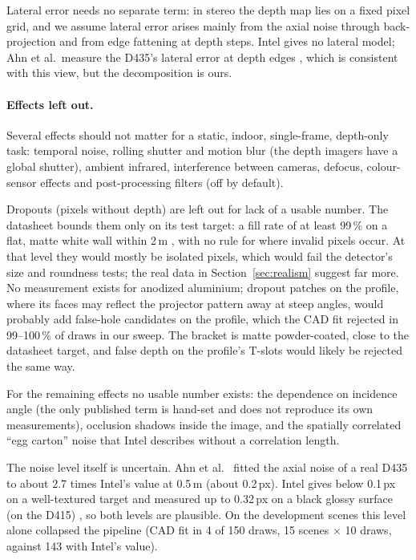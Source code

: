 \documentclass[10pt,a4paper]{article}
\begin{document}
\noindent Lateral error needs no separate term: in stereo the depth map lies on a
fixed pixel grid, and we assume lateral error arises mainly from the axial noise through back-projection and
from edge fattening at depth steps. Intel gives no lateral model; Ahn et al.\ measure the D435's lateral error at depth
edges \cite{ahn}, which is consistent with this view, but the decomposition is ours.

\paragraph{Effects left out.} Several effects should not matter for a static, indoor, single-frame, depth-only
task: temporal noise, rolling shutter and motion blur (the depth imagers have a global shutter), ambient
infrared, interference between cameras, defocus, colour-sensor effects and post-processing filters (off by
default).

Dropouts (pixels without depth) are left out for lack of a usable number. The datasheet bounds
them only on its test target: a fill rate of at least 99\,\% on a flat, matte white wall within 2\,m
\cite{d435ds}, with no rule for where invalid pixels occur. At that level they would mostly be isolated pixels, which
would fail the detector's size and roundness tests; the real data in Section~\ref{sec:realism} suggest far more. No measurement exists for anodized aluminium; dropout patches on the
profile, where its faces may reflect the projector pattern away at steep angles, would probably add
false-hole candidates on the profile, which the CAD fit rejected in 99--100\,\% of draws in our sweep. The bracket is matte
powder-coated, close to the datasheet target, and false depth on the profile's T-slots would likely be rejected
the same way.

For the remaining effects no usable number exists: the
dependence on incidence angle (the only published term \cite{ahn} is hand-set and does not reproduce its own
measurements), occlusion shadows inside the image, and the spatially correlated ``egg carton'' noise that
Intel describes without a correlation length.

The noise level itself is uncertain. Ahn et al.\ \cite{ahn} fitted the axial noise of a real D435 to about
2.7 times Intel's value at 0.5\,m (about 0.2\,px). Intel gives below 0.1\,px on a well-textured target \cite{bkm} and
measured up to 0.32\,px on a black glossy surface (on the D415) \cite{pp}, so both levels are plausible.
On the development scenes this level alone collapsed the pipeline (CAD fit in 4 of 150 draws, 15 scenes
$\times$ 10 draws, against 143 with Intel's value).
\end{document}
